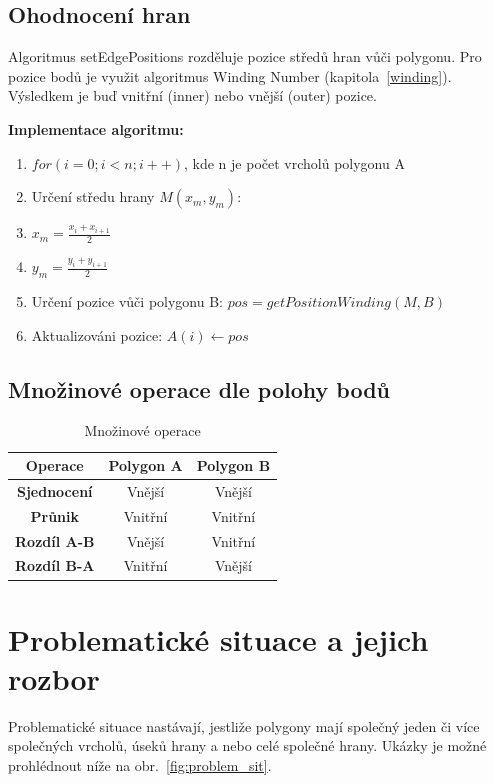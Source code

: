 \documentclass[a4paper, 12pt, oneside, titlepage]{article} %
\begin{document}
\subsection{Ohodnocení hran}
Algoritmus setEdgePositions rozděluje pozice středů hran vůči polygonu. Pro pozice bodů je využit algoritmus Winding Number (kapitola~\ref{winding}). Výsledkem je buď vnitřní (inner) nebo vnější (outer) pozice.

\noindent\textbf{Implementace algoritmu:}
\begin{enumerate}
\item $for(i=0; i<n; i++)$, kde n je počet vrcholů polygonu A
\item \quad Určení středu hrany $M(x_m, y_m)$: 
\item \quad \quad $x_m=\frac{x_i+x_{i+1}}{2}$
\item \quad \quad $y_m=\frac{y_i+y_{i+1}}{2}$
\item \quad Určení pozice vůči polygonu B: $pos=getPositionWinding(M, B)$
\item \quad Aktualizováni pozice: $A(i) \leftarrow pos$
\end{enumerate}

\subsection{Množinové operace dle polohy bodů}
\begin{table}[htbp!]
\centering
\caption{Množinové operace}
\begin{tabular}{|c|c|c|}
\hline
Operace             & \textbf{Polygon A} & \textbf{Polygon B} \\ \hline
\textbf{Sjednocení} & Vnější             & Vnější             \\ \hline
\textbf{Průnik}     & Vnitřní            & Vnitřní            \\ \hline
\textbf{Rozdíl A-B} & Vnější             & Vnitřní            \\ \hline
\textbf{Rozdíl B-A} & Vnitřní            & Vnější             \\ \hline
\end{tabular}
\label{tab:mnop}
\end{table}
\FloatBarrier

\section{Problematické situace a jejich rozbor} \label{problemsit}
Problematické situace nastávají, jestliže polygony mají společný jeden či více společných vrcholů, úseků hrany a nebo celé společné hrany. Ukázky je možné prohlédnout níže na obr.~\ref{fig:problem_sit}.
\end{document}
